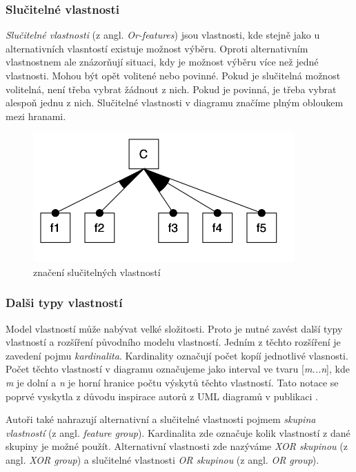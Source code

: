 \subsubsection{Slučitelné vlastnosti}
\textit{Slučitelné vlastnosti} (z angl. \textit{Or-features}) jsou vlastnosti, kde stejně jako u alternativních vlasntostí existuje možnost výběru. Oproti alternativním vlastnostnem ale znázorňují situaci, kdy je možnost výběru více než jedné vlastnosti. Mohou být opět volitené nebo povinné. Pokud je slučitelná možnost volitelná, není třeba vybrat žádnout z nich. Pokud je povinná, je třeba vybrat alespoň jednu z nich. 
Slučitelné vlastnosti v diagramu značíme plným obloukem mezi hranami.
\begin{figure}[H]
	\centering
	\includegraphics[width=10cm]{images/or}
	\caption{značení slučitelných vlastností}
\end{figure}

\subsubsection{Dalši typy vlastností}
Model vlastností může nabývat velké složitosti. Proto je nutné zavést další typy vlastností a rozšíření původního modelu vlastností. Jedním z těchto rozšíření je zavedení pojmu \textit{kardinalita}. Kardinality označují počet kopíí jednotlivé vlasnosti. Počet těchto vlastností v diagramu označujeme jako interval ve tvaru [\textit{m...n}], kde \textit{m} je dolní a \textit{n} je horní hranice počtu výskytů těchto vlastností. Tato notace se poprvé vyskytla z důvodu inspirace autorů z UML diagramů v publikaci \cite{Rieb02}.

Autoři \cite{Rieb02} také nahrazují alternativní a slučitelné vlastnosti pojmem \textit{skupina vlastností} (z angl. \textit{feature group}). Kardinalita zde označuje kolik vlastností z dané skupiny je možné použít. Alternativní vlastnosti zde nazýváme \textit{XOR skupinou} (z angl. \textit{XOR group}) a slučitelné vlastnosti \textit{OR skupinou} (z angl. \textit{OR group}).

